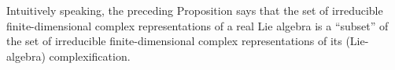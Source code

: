 \vskip 0.5cm
{\color{red}
\begin{remark}
\mbox{}
\vskip 0.05cm
\noindent
Intuitively speaking, the preceding Proposition says that
the set of irreducible finite-dimensional complex representations of a real Lie algebra
is a ``subset'' of 
the set of irreducible finite-dimensional complex representations of its (Lie-algebra) complexification.
\end{remark}
}

